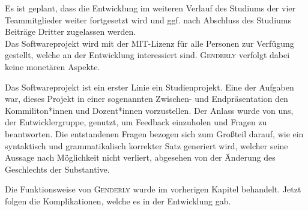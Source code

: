 \documentclass[paper=a4, parskip=half]{scrreprt}
\newcommand{\Genderly}{\textsc{Genderly }}
\begin{document}
Es ist geplant, dass die Entwicklung im weiteren Verlauf des Studiums der vier Teammitglieder weiter fortgesetzt wird und ggf. nach Abschluss des Studiums Beiträge Dritter zugelassen werden. \\
Das Softwareprojekt wird mit der MIT-Lizenz für alle Personen zur Verfügung gestellt, welche an der Entwicklung interessiert sind.
\Genderly verfolgt dabei keine monetären Aspekte. 

Das Softwareprojekt ist ein erster Linie ein Studienprojekt. Eine der Aufgaben war, dieses Projekt in einer sogenannten Zwischen- und Endpräsentation den Kommiliton*innen und Dozent*innen vorzustellen. Der Anlass wurde von uns, der Entwicklergruppe, genutzt, um Feedback einzuholen und Fragen zu beantworten. Die entstandenen Fragen bezogen sich zum Großteil darauf, wie ein syntaktisch und grammatikalisch korrekter Satz generiert wird, welcher seine Aussage nach Möglichkeit nicht verliert, abgesehen von der Änderung des Geschlechts der Substantive.

Die Funktionsweise von \Genderly{} wurde im vorherigen Kapitel behandelt. Jetzt folgen die Komplikationen, welche es in der Entwicklung gab.
\end{document}
